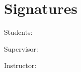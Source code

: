 \documentclass[paper=a4, fontsize=10pt]{scrartcl} %
\begin{document}
\newpage 

\section{Signatures}


\hspace{2mm}  Students:

\vspace{5mm}
\underline{\hspace{10cm}}
\vspace{5mm}

\underline{\hspace{10cm}}
\vspace{5mm}

\underline{\hspace{10cm}}
\vspace{5mm}

Supervisor:

\vspace{5mm}
\underline{\hspace{10cm}}
\vspace{5mm}

Instructor:

\vspace{5mm}
\underline{\hspace{10cm}}
\end{document}
